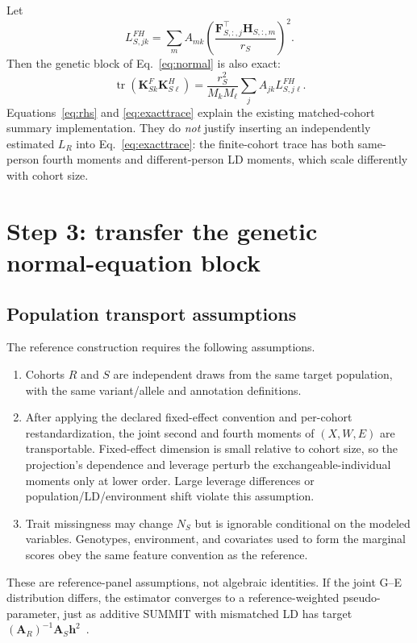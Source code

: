 \documentclass[11pt]{article}
\newcommand{\tr}{\operatorname{tr}}
\newcommand{\bK}{\bm K}
\begin{document}
Let
\begin{equation}
 L^{FH}_{S,jk}=\sum_m A_{mk}
 \left(\frac{\bm F_{S,:,j}^\top\bm H_{S,:,m}}{r_S}\right)^2.
 \label{eq:ldpanel}
\end{equation}
Then the genetic block of Eq.~\eqref{eq:normal} is also exact:
\begin{equation}
 \tr(\bK^F_{Sk}\bK^H_{S\ell})
 =\frac{r_S^2}{M_kM_\ell}\sum_j A_{jk}L^{FH}_{S,j\ell}.
 \label{eq:exacttrace}
\end{equation}
Equations~\eqref{eq:rhs} and \eqref{eq:exacttrace} explain the existing
matched-cohort summary implementation.  They do \emph{not} justify inserting
an independently estimated $L_R$ into Eq.~\eqref{eq:exacttrace}: the
finite-cohort trace has both same-person fourth moments and different-person
LD moments, which scale differently with cohort size.

\section{Step 3: transfer the genetic normal-equation block}

\subsection{Population transport assumptions}

The reference construction requires the following assumptions.
\begin{enumerate}
 \item Cohorts $R$ and $S$ are independent draws from the same target
 population, with the same variant/allele and annotation definitions.
 \item After applying the declared fixed-effect convention and per-cohort
 restandardization, the joint second and fourth moments of $(X,W,E)$ are
 transportable.  Fixed-effect dimension is small relative to cohort size, so
 the projection's dependence and leverage perturb the exchangeable-individual
 moments only at lower order.  Large leverage differences or
 population/LD/environment shift violate this assumption.
 \item Trait missingness may change $N_S$ but is ignorable conditional on the
 modeled variables.  Genotypes, environment, and covariates used to form the
 marginal scores obey the same feature convention as the reference.
\end{enumerate}
These are reference-panel assumptions, not algebraic identities.  If the
joint G--E distribution differs, the estimator converges to a reference-weighted
pseudo-parameter, just as additive SUMMIT with mismatched LD has target
$(\bm A_R)^{-1}\bm A_S\bm h^2$~\cite{summit}.
\end{document}
